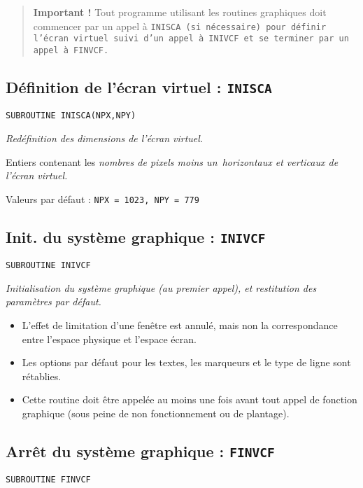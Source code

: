 \documentclass[a4paper,12pt,titlepage]{article}
\newcommand{\darg}[1]{\item[\tt #1\rm]}
\newcommand{\fsub}[1]{\hbox {\tt SUBROUTINE #1  } \medskip }
\newenvironment{argdesc}{\begin{list}{-}{\leftmargin 8em \labelwidth 7em}}%
{\end{list}}
\begin{document}
\begin{quote}
    {\bf Important ! } Tout programme utilisant les routines graphiques
doit commencer par un appel \`a \tt INISCA\rm\ (si n\'ecessaire) pour
d\'efinir l'\'ecran virtuel suivi d'un appel \`a \tt INIVCF\rm\ et se
terminer par un appel \`a \tt FINVCF\rm.
\end{quote}

\subsection{D\'efinition de l'\'ecran virtuel : \tt INISCA}
\fsub{INISCA(NPX,NPY)}

  \em  Red\'efinition des dimensions de l'\'ecran virtuel.\em
\begin{argdesc}
    \darg{NPX,NPY :} Entiers contenant les \em nombres de pixels moins
		      un\em\ horizontaux et verticaux de l'\'ecran virtuel. 

                 Valeurs par d\'efaut : \tt NPX\rm\ = 1023, \tt NPY\rm\  = 779
\end{argdesc}

\subsection{Init. du syst\`eme graphique : \tt INIVCF}
\fsub{INIVCF}

   \em Initialisation  du syst\`eme graphique (au  premier  appel),  et 
restitution des param\`etres par d\'e\-faut.\em
\begin{itemize}
              \item L'effet de limitation d'une fen\^etre est annul\'e, mais 
              non  la  correspondance  entre l'espace  physique et l'espace 
              \'ecran.

              \item Les  options  par  d\'efaut  pour  les   textes,   les 
              marqueurs et le type de ligne sont r\'etablies.

              \item Cette  routine doit \^etre appel\'ee au moins  une  fois 
              avant  tout appel de fonction graphique (sous  peine 
              de non fonctionnement ou de plantage).
\end{itemize}

\subsection{Arr\^et du syst\`eme graphique : \tt FINVCF}
\fsub{FINVCF}
\end{document}
